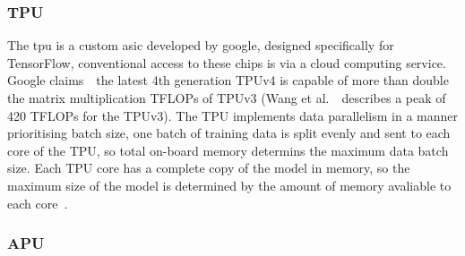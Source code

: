 \documentclass[../../D1.tex]{subfiles}
\begin{document}
\subsubsection{TPU}
The \acrshort{tpu} is a custom \acrshort{asic} developed by google, designed specifically for TensorFlow, conventional access to these chips is via a cloud computing service. 
Google claims~\autocite{GoogleWinsMLPerf}~the latest 4th generation TPUv4 is capable of more than double the matrix multiplication TFLOPs of TPUv3 (Wang et al.~\autocite{wangBenchmarkingTPUGPU2019}~describes a peak of 420 TFLOPs for the TPUv3).
The TPU implements data parallelism in a manner prioritising batch size, one batch of training data is split evenly and sent to each core of the TPU, so total on-board memory determins the maximum data batch size.
Each TPU core has a complete copy of the model in memory, so the maximum size of the model is determined by the amount of memory avaliable to each core~\autocite{wangBenchmarkingTPUGPU2019}.


\subsubsection{APU}
\end{document}
